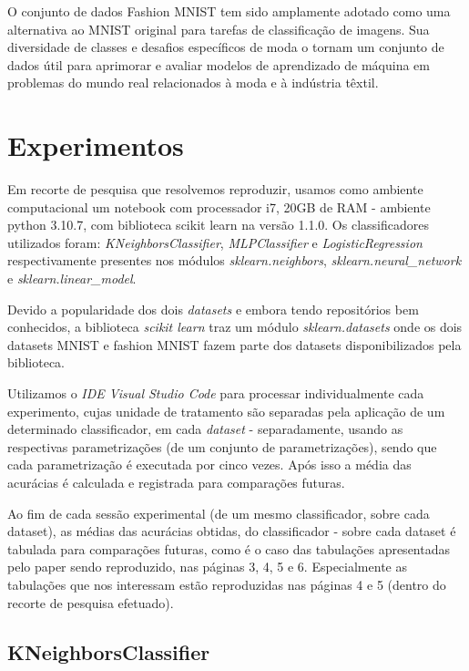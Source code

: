 \documentclass{article}
\begin{document}
O conjunto de dados Fashion MNIST tem sido amplamente adotado como uma alternativa ao MNIST original para tarefas de classificação de imagens. Sua diversidade de classes e desafios específicos de moda o tornam um conjunto de dados útil para aprimorar e avaliar modelos de aprendizado de máquina em problemas do mundo real relacionados à moda e à indústria têxtil.


\section{Experimentos}

Em recorte de pesquisa que resolvemos reproduzir, usamos como ambiente computacional um notebook com
processador i7, 20GB de RAM - ambiente python 3.10.7, com biblioteca scikit learn na versão 1.1.0. Os classificadores utilizados foram: \textit{KNeighborsClassifier}, \textit{MLPClassifier} e \textit{LogisticRegression} respectivamente presentes nos módulos \textit{sklearn.neighbors}, \textit{sklearn.neural\_network} e \textit{sklearn.linear\_model}.

Devido a popularidade dos dois \textit{datasets} e embora tendo repositórios bem conhecidos, a biblioteca \textit{ scikit learn} traz um módulo \textit{sklearn.datasets} onde os dois datasets MNIST e fashion MNIST fazem parte dos datasets disponibilizados pela biblioteca.

Utilizamos o \textit{IDE Visual Studio Code} para processar individualmente cada experimento, cujas unidade de tratamento são separadas pela aplicação de um determinado classificador, em cada \textit{dataset} - separadamente, usando as respectivas parametrizações (de um conjunto de parametrizações), sendo que cada parametrização é executada por cinco vezes. Após isso a média das acurácias é calculada e registrada para comparações futuras. 

Ao fim de cada sessão experimental (de um mesmo classificador, sobre cada dataset), as médias das acurácias obtidas, do classificador - sobre cada dataset é tabulada para comparações futuras, como é o caso das tabulações apresentadas pelo paper \cite{Xiao2017FashionMNISTAN} sendo reproduzido, nas páginas 3, 4, 5 e 6. Especialmente as tabulações que nos interessam estão reproduzidas nas páginas 4 e 5 (dentro do recorte de pesquisa efetuado).

\subsection{KNeighborsClassifier}
\end{document}
